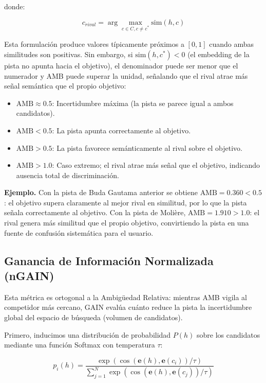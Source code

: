 \documentclass[../main.tex]{subfiles}
\begin{document}
donde:

\[
c_{rival} =
\arg\max_{c \in C, c \neq c^*}
\text{sim}(h, c)
\]

Esta formulación produce valores típicamente próximos a $[0, 1]$ cuando ambas similitudes son positivas. Sin embargo, si $\text{sim}(h, c^*) < 0$ (el embedding de la pista no apunta hacia el objetivo), el denominador puede ser menor que el numerador y AMB puede superar la unidad, señalando que el rival atrae más señal semántica que el propio objetivo:

\begin{itemize}
    \item $\text{AMB} \approx 0.5$: Incertidumbre máxima (la pista se parece igual a ambos candidatos).
    \item $\text{AMB} < 0.5$: La pista apunta correctamente al objetivo.
    \item $\text{AMB} > 0.5$: La pista favorece semánticamente al rival sobre el objetivo.
    \item $\text{AMB} > 1.0$: Caso extremo; el rival atrae más señal que el objetivo, indicando ausencia total de discriminación.
\end{itemize}

\medskip
\textbf{Ejemplo.} Con la pista de Buda Gautama anterior se obtiene $\text{AMB} = 0.360 < 0.5$: el objetivo supera claramente al mejor rival en similitud, por lo que la pista señala correctamente al objetivo. Con la pista de Molière, $\text{AMB} = 1.910 > 1.0$: el rival genera más similitud que el propio objetivo, convirtiendo la pista en una fuente de confusión sistemática para el usuario.

\subsection{Ganancia de Información Normalizada (nGAIN)}

Esta métrica es ortogonal a la Ambigüedad Relativa: mientras AMB vigila al competidor más cercano, GAIN evalúa cuánto reduce la pista la incertidumbre global del espacio de búsqueda (volumen de candidatos).

Primero, inducimos una distribución de probabilidad $P(h)$ sobre los candidatos mediante una función Softmax con temperatura $\tau$:

\begin{equation}
p_i(h) =
\frac{\exp(\cos(\mathbf{e}(h), \mathbf{e}(c_i))/\tau)}
{\sum_{j=1}^{N} \exp(\cos(\mathbf{e}(h), \mathbf{e}(c_j))/\tau)}
\end{equation}
\end{document}
